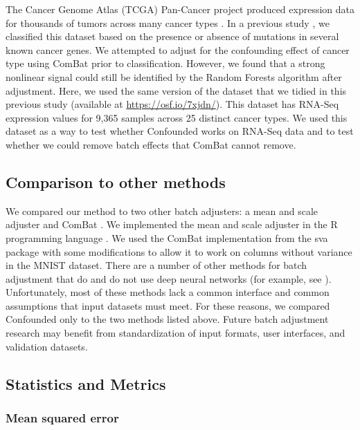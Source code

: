 \documentclass[notitlepage]{article}
\begin{document}
The Cancer Genome Atlas (TCGA) Pan-Cancer project produced expression data for thousands of tumors across many cancer types \cite{the_cancer_genome_atlas_research_network_cancer_2013}.
In a previous study \cite{dayton_classifying_2017-1}, we classified this dataset based on the presence or absence of mutations in several known cancer genes.
We attempted to adjust for the confounding effect of cancer type using ComBat prior to classification.
However, we found that a strong nonlinear signal could still be identified by the Random Forests algorithm after adjustment.
Here, we used the same version of the dataset that we tidied in this previous study (available at \href{https://osf.io/7xjdn/}{https://osf.io/7xjdn/}).
This dataset has RNA-Seq expression values for 9,365 samples across 25 distinct cancer types.
We used this dataset as a way to test whether Confounded works on RNA-Seq data and to test whether we could remove batch effects that ComBat cannot remove.

\subsection{Comparison to other methods}

We compared our method to two other batch adjusters: a mean and scale adjuster and ComBat \cite{johnson_adjusting_2007}.
We implemented the mean and scale adjuster in the R programming language \cite{r_core_team_r_2014}.
We used the ComBat implementation from the sva package \cite{leek_sva_2017} with some modifications to allow it to work on columns without variance in the MNIST dataset.
There are a number of other methods for batch adjustment that do and do not use deep neural networks (for example, see \cite{leek_capturing_2007,espin-perez_comparison_2018,shaham_removal_2017,shaham_batch_2018}). %
Unfortunately, most of these methods lack a common interface and common assumptions that input datasets must meet.
For these reasons, we compared Confounded only to the two methods listed above.
Future batch adjustment research may benefit from standardization of input formats, user interfaces, and validation datasets.

\subsection{Statistics and Metrics}

\subsubsection{Mean squared error}
\end{document}
